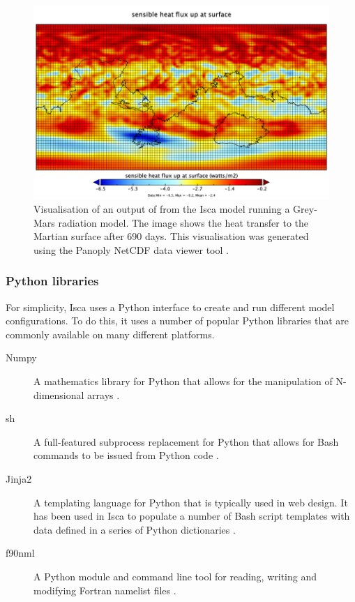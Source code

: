 \documentclass[a4paper,11pt]{report}
\begin{document}
\begin{figure}[htbp]
\begin{center}
\includegraphics[width=\textwidth]{img/flux_t_in_atmos_daily.png}
\caption[Visual output from the Isca model]{Visualisation of an output of from the Isca model running a Grey-Mars radiation model. The image shows the heat transfer to the Martian surface after 690 days. This visualisation was generated using the Panoply NetCDF data viewer tool \cite{schmunk2015panoply}.}
\label{fig:netcdf}
\end{center}
\end{figure}

\subsubsection{Python libraries}
For simplicity, Isca uses a Python interface to create and run different model configurations. To do this, it uses a number of popular Python libraries that are commonly available on many different platforms.

\begin{description}
	\item[Numpy] A mathematics library for Python that allows for the manipulation of N-dimensional arrays \cite{van2011numpy}.
	
	\item[sh] A full-featured subprocess replacement for Python that allows for Bash commands to be issued from Python code \cite{moffat2017sh}. 
	
	\item[Jinja2] A templating language for Python that is typically used in web design. It has been used in Isca to populate a number of Bash script templates with data defined in a series of Python dictionaries \cite{ronacher2008jinja2}. 
	
	\item[f90nml] A Python module and command line tool for reading, writing and modifying Fortran namelist files \cite{wardf90nml}. 
	
\end{description}
\end{document}
